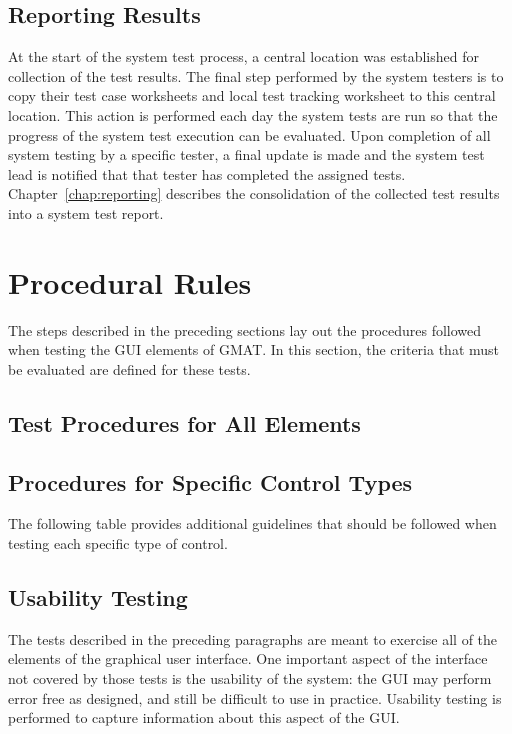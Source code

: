 \subsection{Reporting Results}

At the start of the system test process, a central location was established for collection of the
test results.  The final step performed by the system testers is to copy their test case worksheets
and local test tracking worksheet to this central location.  This action is performed each day the
system tests are run so that the progress of the system test execution can be evaluated.  Upon
completion of all system testing by a specific tester, a final update is made and the system test
lead is notified that that tester has completed the assigned tests.  Chapter~\ref{chap:reporting}
describes the consolidation of the collected test results into a system test report.

\section{\label{section:TestRules}Procedural Rules}

The steps described in the preceding sections lay out the procedures followed when testing the GUI
elements of GMAT.  In this section, the criteria that must be evaluated are defined for these
tests.

\subsection{\label{Sec:GeneralTests}Test Procedures for All Elements}



\subsection{Procedures for Specific Control Types}
The following table provides additional guidelines that should be followed when testing each
specific type of control.


\subsection{Usability Testing}

The tests described in the preceding paragraphs are meant to exercise all of the elements of the
graphical user interface.  One important aspect of the interface not covered by those tests is the
usability of the system: the GUI may perform error free as designed, and still be difficult to use
in practice.  Usability testing is performed to capture information about this aspect of the GUI.

